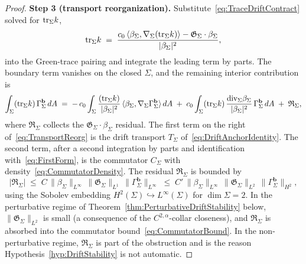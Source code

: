 \begin{proof}
\textbf{Step 3 (transport reorganization).}
Substitute~\eqref{eq:TraceDriftContract} solved for $\mathrm{tr}_\Sigma k$,
\[
    \mathrm{tr}_\Sigma k \;=\; \frac{c_0\,\langle\beta_\Sigma,\nabla_\Sigma(\mathrm{tr}_\Sigma k)\rangle-\mathfrak G_\Sigma\cdot\beta_\Sigma}{|\beta_\Sigma|^2},
\]
into the Green-trace pairing and integrate the leading term by parts. The boundary term vanishes on the closed $\Sigma$, and the remaining interior contribution is
\begin{equation}\label{eq:TransportReorg}
    \int_\Sigma (\mathrm{tr}_\Sigma k)\,\Gamma_\Sigma^{\mathbf b}\,dA
    \;=\;
    -\,c_0\int_\Sigma\frac{(\mathrm{tr}_\Sigma k)}{|\beta_\Sigma|^2}\,\langle\beta_\Sigma,\nabla_\Sigma\Gamma_\Sigma^{\mathbf b}\rangle\,dA
    \;+\;c_0\int_\Sigma(\mathrm{tr}_\Sigma k)\,\frac{\mathrm{div}_\Sigma\beta_\Sigma}{|\beta_\Sigma|^2}\,\Gamma_\Sigma^{\mathbf b}\,dA
    \;+\;\mathfrak R_\Sigma ,
\end{equation}
where $\mathfrak R_\Sigma$ collects the $\mathfrak G_\Sigma\cdot\beta_\Sigma$ residual. The first term on the right of~\eqref{eq:TransportReorg} is the drift transport $T_\Sigma$ of~\eqref{eq:DriftAnchorIdentity}. The second term, after a second integration by parts and identification with~\eqref{eq:FirstForm}, is the commutator $C_\Sigma$ with density~\eqref{eq:CommutatorDensity}. The residual $\mathfrak R_\Sigma$ is bounded by
\begin{equation}\label{eq:ResidualBound}
    |\mathfrak R_\Sigma|\;\le\;C\,\|\beta_\Sigma\|_{L^\infty}\,\|\mathfrak G_\Sigma\|_{L^1}\,\|\Gamma_\Sigma^{\mathbf b}\|_{L^\infty}
    \;\le\;C'\,\|\beta_\Sigma\|_{L^\infty}\,\|\mathfrak G_\Sigma\|_{L^2}\,\|\Gamma_\Sigma^{\mathbf b}\|_{H^2},
\end{equation}
using the Sobolev embedding $H^2(\Sigma)\hookrightarrow L^\infty(\Sigma)$ for $\dim\Sigma=2$. In the perturbative regime of Theorem~\ref{thm:PerturbativeDriftStability} below, $\|\mathfrak G_\Sigma\|_{L^2}$ is small (a consequence of the $C^{2,\alpha}$-collar closeness), and $\mathfrak R_\Sigma$ is absorbed into the commutator bound~\eqref{eq:CommutatorBound}. In the non-perturbative regime, $\mathfrak R_\Sigma$ is part of the obstruction and is the reason Hypothesis~\ref{hyp:DriftStability} is not automatic.


\end{proof}
